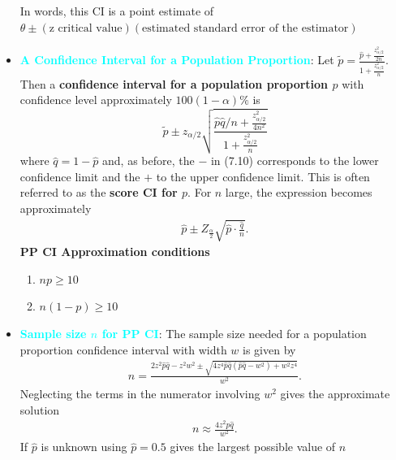 \documentclass{report}
\begin{document}
\begin{itemize}
            \bigbreak \noindent 
            In words, this CI is a
            \bigbreak \noindent 
            point estimate of $\theta \pm (\text{z critical value})(\text{estimated standard error of the estimator})$
        \item \textbf{\textcolor{cyan}{A Confidence Interval for a Population Proportion}}:
            Let $\tilde{p} = \frac{\hat{p} + \frac{z_{\alpha/2}^2}{2n}}{1 + \frac{z_{\alpha/2}^2}{n}}$. Then a \textbf{confidence interval for a population proportion $p$} with confidence level approximately $100(1 - \alpha)\%$ is
            \[
                \tilde{p} \pm z_{\alpha/2} \sqrt{\frac{\hat{p} \hat{q} / n + \frac{z_{\alpha/2}^2}{4n^2}}{1 + \frac{z_{\alpha/2}^2}{n}}}
            \]
            where $\hat{q} = 1 - \hat{p}$ and, as before, the $-$ in (7.10) corresponds to the lower confidence limit and the $+$ to the upper confidence limit.
            \bigbreak \noindent  
            This is often referred to as the \textbf{score CI for $p$}.
            \bigbreak \noindent 
            For $n$ large, the expression becomes approximately
            \begin{align*}
                \hat{p} \pm Z_{\frac{\alpha}{2}} \sqrt{\hat{p} \cdot \frac{\hat{q}}{n}}
            .\end{align*}
        \itme \textbf{PP CI Approximation conditions}
        \begin{enumerate}
            \item $np \geq 10$
            \item $n(1-p) \geq 10$
        \end{enumerate}
        \item \textbf{\textcolor{cyan}{Sample size $n$ for PP CI}}:
            The sample size needed for a population proportion confidence interval  with width $w$ is given by
            \bigbreak \noindent 
            \begin{align*}
                n = \frac{2z^{2}\hat{p}\hat{q} - z^{2}w^{2} \pm  \sqrt{4z^{4}\hat{p}\hat{q}(\hat{p}\hat{q}- w^{2}) + w^{2}z^{4}}}{w^{2}}
            .\end{align*}
            \bigbreak \noindent 
            Neglecting the terms in the numerator involving $w^{2}$ gives the approximate solution
            \begin{align*}
                n \approx  \frac{4z^{2}\hat{p}\hat{q}}{w^{2}}
            .\end{align*}
            If $\hat{p}$ is unknown using $\hat{p} = 0.5$ gives the largest possible value of $n$

\end{itemize}
\end{document}
